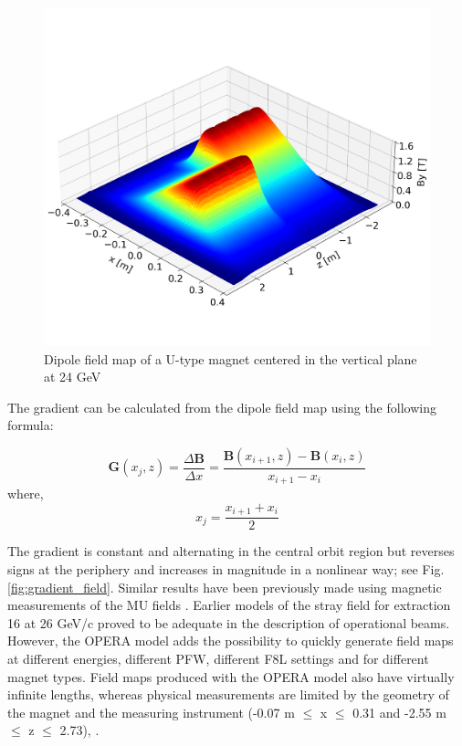 \documentclass[a4paper,
               biblatex,     %
               keeplastbox,   %
               ]{jacow}
\begin{document}
\begin{figure}[!htb]
   \centering
   \includegraphics*[width=1.0\columnwidth, trim={0 2.9cm 0 4.3cm},clip]{dipole_field.png}
   \caption{Dipole field map of a U-type magnet centered in the vertical plane at 24 GeV}
   \label{fig:dipole_field}
\end{figure}

The gradient can be calculated from the dipole field map using the following formula:
 
$$ \boldsymbol{G}(x_{j},z) = \frac{\Delta\boldsymbol{B}}{\Delta x} = \frac{\boldsymbol{B}(x_{i+1},z) - \boldsymbol{B}(x_{i},z)}{x_{i+1}-x_{i}} $$
where,
$$ x_{j} = \frac{x_{i+1} + x_{i}}{{2}} $$
 
The gradient is constant and alternating in the central orbit region but reverses signs at the periphery and increases in magnitude in a nonlinear way; see Fig.\ref{fig:gradient_field}. Similar results have been previously made using magnetic measurements of the MU fields \cite{manglunki_beam_1997}. Earlier models of the stray field for extraction 16 at 26 GeV/c proved to be adequate in the description of operational beams. However, the OPERA model adds the possibility to quickly generate field maps at different energies, different PFW, different F8L settings and for different magnet types. Field maps produced with the OPERA model also have virtually infinite lengths, whereas physical measurements are limited by the geometry of the magnet and the measuring instrument (-0.07 m $\leq$ x $\leq$ 0.31 and -2.55 m $\leq$ z $\leq$ 2.73), \cite{manglunki_beam_1997}.
\end{document}
